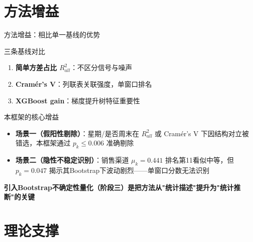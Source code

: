 \documentclass{beamer}
\begin{document}
\section{方法增益}

\begin{frame}{方法增益：相比单一基线的优势}
    \begin{block}{三条基线对比}
        \begin{enumerate}
            \item \textbf{简单方差占比 $R^2_{all}$}：不区分信号与噪声
            \item \textbf{Cramér's V}：列联表关联强度，单窗口排名
            \item \textbf{XGBoost gain}：梯度提升树特征重要性
        \end{enumerate}
    \end{block}
    
    \begin{block}{本框架的核心增益}
        \begin{itemize}
            \item \textbf{场景一（假阳性剔除）}：星期/是否周末在 $R^2_{all}$ 或 Cramér's V 下因结构对立被错选，本框架通过 $p_k \leq 0.006$ 准确剔除
            \item \textbf{场景二（隐性不稳定识别）}：销售渠道 $\mu_k = 0.441$ 排名第11看似中等，但 $p_k = 0.047$ 揭示其Bootstrap下波动剧烈——单窗口分数无法识别
        \end{itemize}
    \end{block}
    
    \begin{center}
        \textbf{引入Bootstrap不确定性量化（阶段三）是把方法从"统计描述"提升为"统计推断"的关键}
    \end{center}
\end{frame}

\section{理论支撑}
\end{document}
